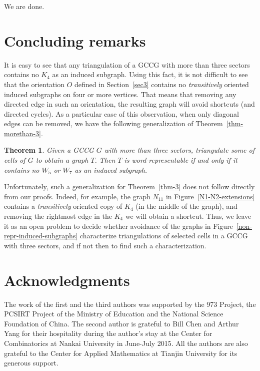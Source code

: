 \documentclass[12pt]{article}
\newtheorem{thm}{Theorem}[section]
\numberwithin{equation}{section}
\begin{document}
We are done.

\section{Concluding remarks}\label{sec5}

It is easy to see that any triangulation of a GCCG with more than three sectors contains no $K_4$ as an induced subgraph. Using this fact, it is not difficult to see that the orientation $O$ defined in Section~\ref{sec3} contains no {\em transitively} oriented induced subgraphs on four or more vertices. That means that removing any directed edge in such an orientation, the resulting graph will avoid shortcuts (and directed cycles). As a particular case of this observation, when only diagonal edges can be removed, we have the following generalization of Theorem~\ref{thm-morethan-3}.

\begin{thm} Given a GCCG $G$ with more than three sectors, triangulate some of cells of $G$ to obtain a graph $T$. Then $T$ is word-representable if and only if it contains no $W_5$ or $W_7$ as an induced subgraph. \end{thm}

Unfortunately, such a generalization for Theorem~\ref{thm-3} does not follow directly from our proofs. Indeed, for example, the graph $N_{11}$ in Figure~\ref{N1-N2-extensions} contains a {\em transitively} oriented copy of $K_4$ (in the middle of the graph), and removing the rightmost edge in the $K_4$ we will obtain a shortcut. Thus, we leave it as an open problem to decide whether avoidance of the graphs in Figure~\ref{non-repr-induced-subgraphs} characterize triangulations of selected cells in a GCCG with three sectors, and if not then to find such a characterization.

\section*{Acknowledgments}

The work of the first and the third authors was supported by the 973 Project, the PCSIRT Project of the Ministry of Education and the National Science Foundation of China. The  second author is grateful to Bill Chen and Arthur Yang for their hospitality during the author's stay at the Center for Combinatorics at Nankai University in June-July 2015. All the authors are also grateful to the  Center for Applied Mathematics at Tianjin University for its generous support.
\end{document}
